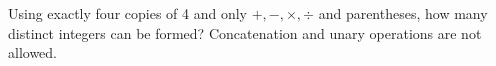 Using exactly four copies of 4 and only $+,-,\times,\div$ and parentheses, how many distinct integers can be formed? Concatenation and unary operations are not allowed.
